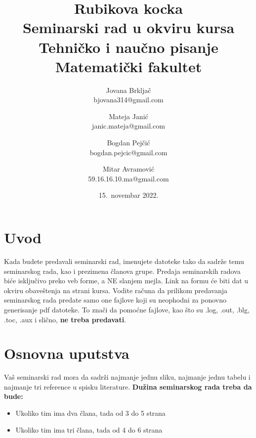 \documentclass[a4paper]{article}
\begin{document}
\title{Rubikova kocka\\ \small{Seminarski rad u okviru kursa\\Tehničko i naučno pisanje\\ Matematički fakultet}}

\author{Jovana Brkljač\\ bjovana314@gmail.com \and Mateja Janić\\ janic.mateja@gmail.com \and Bogdan Pejčić \\ bogdan.pejcic@gmail.com \and Mitar Avramović \\ 59.16.16.10.ma@gmail.com}
\date{15.~novembar 2022.}
\maketitle

\tableofcontents

\newpage

\section{Uvod}
\label{sec:uvod}
Kada budete predavali seminarski rad, imenujete datoteke tako da sadrže temu seminarskog rada, kao i prezimena članova grupe. Predaja seminarskih radova biće isključivo preko veb forme, a NE slanjem mejla. Link na formu će biti dat u okviru obaveštenja na strani kursa. Vodite računa da prilikom predavanja seminarskog rada predate samo one fajlove koji su neophodni za ponovno generisanje pdf datoteke. To znači da pomoćne fajlove, kao što su .log, .out, .blg, .toc, .aux i slično, \textbf{ne treba predavati}.

\section{Osnovna uputstva}
Vaš seminarski rad mora da sadrži najmanje jednu sliku, najmanje jednu tabelu i najmanje tri reference u spisku literature. \textbf{Dužina seminarskog rada treba da bude:}
\begin{itemize}
\item Ukoliko tim ima dva člana, tada od 3 do 5 strana
\item Ukoliko tim ima tri člana, tada od 4 do 6 strana
\end{itemize} 
\end{document}
